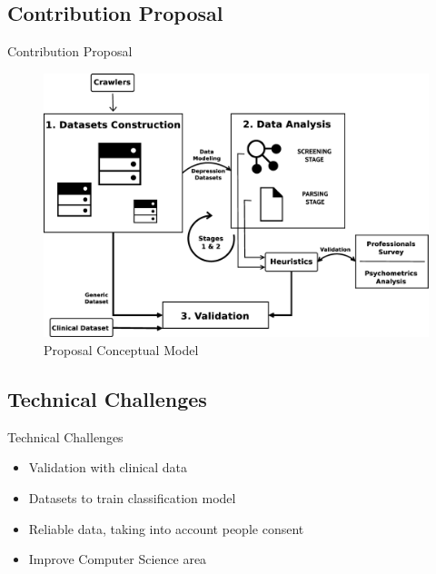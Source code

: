 \documentclass[aspectratio=169,10pt,xcolor={dvipsnames}]{beamer}
\begin{document}
\subsection{Contribution Proposal}

\begin{frame}{Contribution Proposal}
  \begin{figure}
    \centering
    \includegraphics[scale=.175]{Graphics/conceptualModel.eps}
    \caption{\small{Proposal Conceptual Model}}
    \label{fig:conceptualModel}
  \end{figure}
\end{frame}

\subsection{Technical Challenges}
\begin{frame}{Technical Challenges}
  \begin{itemize}
    \item Validation with clinical data
    \item Datasets to train classification model
    \item Reliable data, taking into account people consent
    \item Improve Computer Science area
  \end{itemize}
\end{frame}

  
\end{document}
